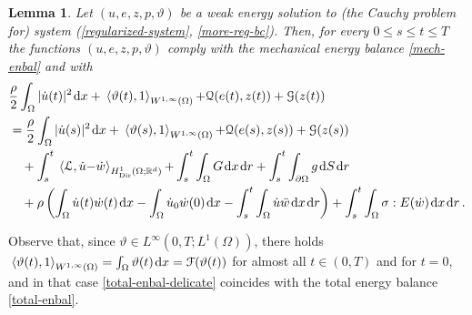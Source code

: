 \documentclass[a4paper,10pt,reqno]{amsart}
\numberwithin{equation}{section}
\newcommand{\R}{\mathbb{R}}
\numberwithin{equation}{section}
\newtheorem{lemma}[theorem]{Lemma}
\def\calG{{\mathcal G}} \def\calH{{\mathcal H}} \def\calI{{\mathcal I}}
\def\dd{\;\!\mathrm{d}} %
\newcommand{\pairing}[4]{ \sideset{_{ #1 }}{_{ #2 }}  {\mathop{\langle #3 , #4
\rangle}}}
\newcommand{\teta}{\vartheta}
\newcommand{\sig}[1]{E(#1)}
\newcommand{\Dir}{\mathrm{Dir}}
\begin{document}
\begin{lemma}
\label{cor:total-enid} 
Let $(u,e,z,p,\teta)$ be a   \emph{weak energy solution} to (the Cauchy problem for) system
(\ref{regularized-system}, \ref{more-reg-bc}).
 Then,    for every $0\leq s \leq t \leq T$ the functions
  $(u,e,z,p,\teta)$
 comply
 with 
 the mechanical energy balance \eqref{mech-enbal} and with 
 \begin{equation}
\label{total-enbal-delicate}
\begin{aligned}
& 
\frac{\rho}2 \int_\Omega |\dot{u}(t)|^2 \dd x + \pairing{}{W^{1,\infty}(\Omega)}{\teta(t)}{1} + \calQ(e(t),z(t)) + \calG(z(t)) \\
&  = \frac{\rho}2 \int_\Omega |\dot{u}(s)|^2 \dd x + \pairing{}{W^{1,\infty}(\Omega)}{\teta(s)}{1} + \calQ(e(s),z(s)) + \calG(z(s))
\\
& \quad 
  + \int_s^t \pairing{}{H_\Dir^1 (\Omega;\R^d)}{\mathcal{L}}{\dot u{-} \dot w} 
    +\int_s^t \int_\Omega G \dd x \dd r + \int_s^t \int_{\partial\Omega} g \dd S \dd r
\\
& \quad   +\rho \left( \int_\Omega \dot{u}(t) \dot{w}(t) \dd x -  \int_\Omega \dot{u}_0 \dot{w}(0) \dd x - \int_s^t \int_\Omega \dot{u}\ddot w \dd x \dd r \right)     + 
\int_s^t \int_\Omega \sigma: \sig{\dot w} \dd x \dd r\,.
 \end{aligned}
\end{equation}
\end{lemma}
\noindent Observe that, since $\teta\in L^\infty(0,T; L^1(\Omega))$, there holds $ \pairing{}{W^{1,\infty}(\Omega)}{\teta(t)}{1}  = \int_\Omega \teta(t) \dd x  = \calF(\teta(t))$
 for almost all $t\in (0,T)$ and for $t=0$, and in that case \eqref{total-enbal-delicate}
coincides with the total energy balance \eqref{total-enbal}.
\end{document}
